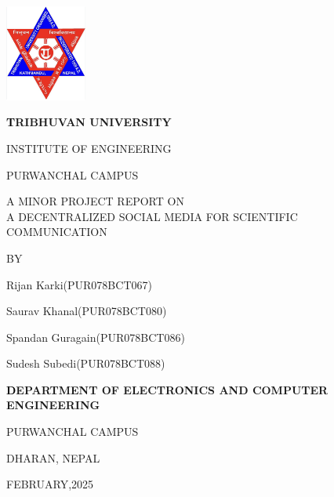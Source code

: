 \begin{titlepage}
    \centering
    
    \includegraphics[width=0.2\textwidth]{Graphics/TULogo.png}\par
    \vspace{1.2cm}
    {\fontsize{14pt}{12pt}\selectfont\bfseries\textcolor{black}
    TRIBHUVAN UNIVERSITY \par INSTITUTE OF ENGINEERING \par PURWANCHAL CAMPUS \par
    \vspace{1.2cm}
    \begin{flushleft}
    
    \end{flushleft}

\begin{center}
    A MINOR PROJECT REPORT ON \\
    A DECENTRALIZED SOCIAL MEDIA FOR SCIENTIFIC COMMUNICATION
\end{center}

    \vspace{1.2cm}
    BY\par Rijan Karki(PUR078BCT067)
      \par Saurav Khanal(PUR078BCT080)
      \par Spandan Guragain(PUR078BCT086)
      \par Sudesh Subedi(PUR078BCT088)
    \vspace{1.2cm}\par
    }
    {\fontsize{13pt}{12pt}\selectfont\bfseries\textcolor{black}
    DEPARTMENT OF ELECTRONICS AND COMPUTER ENGINEERING\par PURWANCHAL CAMPUS\par DHARAN, NEPAL\par
    \vspace{1.2cm}
    \vspace{1.2cm}
    
    FEBRUARY,2025 
    }
\end{titlepage}
